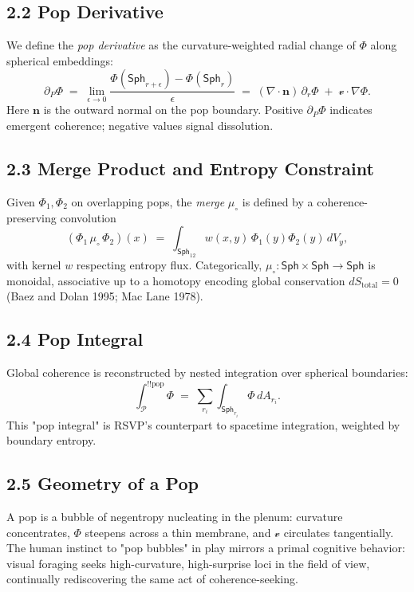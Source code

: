 \documentclass[12pt,a4paper]{article}
\newcommand{\Pl}{\mathcal{P}}
\newcommand{\Sph}{\mathsf{Sph}}
\newcommand{\vv}{\mathcal{v}}
\newcommand{\dP}{\partial_{P}}
\newcommand{\popint}{\int_{\Pl}^{!!\mathrm{pop}}}
\newcommand{\muo}{\mu_{\circ}}
\theoremstyle{definition}
\theoremstyle{plain}
\begin{document}
\subsection*{2.2 Pop Derivative}
We define the \emph{pop derivative} as the curvature-weighted radial change of $\Phi$ along spherical embeddings:
\begin{equation}
\dP \Phi \;=\; \lim_{\epsilon\to 0}\frac{\Phi(\Sph_{r+\epsilon})-\Phi(\Sph_r)}{\epsilon}
\;=\; (\nabla\cdot \mathbf{n})\,\partial_r \Phi \;+\; \vv\cdot\nabla\Phi.
\label{eq:pop-derivative}
\end{equation}
Here $\mathbf{n}$ is the outward normal on the pop boundary. Positive $\dP\Phi$ indicates emergent coherence; negative values signal dissolution.

\subsection*{2.3 Merge Product and Entropy Constraint}
Given $\Phi_1,\Phi_2$ on overlapping pops, the \emph{merge} $\muo$ is defined by a coherence-preserving convolution
\begin{equation}
(\Phi_1\,\muo\,\Phi_2)(x)\;=\;\int_{\Sph_{12}} w(x,y)\,\Phi_1(y)\Phi_2(y)\,dV_y,
\label{eq:merge}
\end{equation}
with kernel $w$ respecting entropy flux. Categorically, $\muo:\Sph\times\Sph\to\Sph$ is monoidal, associative up to a homotopy encoding global conservation $dS_{\text{total}}=0$ (Baez and Dolan 1995; Mac Lane 1978).

\subsection*{2.4 Pop Integral}
Global coherence is reconstructed by nested integration over spherical boundaries:
\begin{equation}
\popint \Phi \;=\; \sum_{r_i}\int_{\Sph_{r_i}}\Phi\,dA_{r_i}.
\label{eq:pop-integral}
\end{equation}
This "pop integral" is RSVP's counterpart to spacetime integration, weighted by boundary entropy.

\subsection*{2.5 Geometry of a Pop}
A pop is a bubble of negentropy nucleating in the plenum: curvature concentrates, $\Phi$ steepens across a thin membrane, and $\vv$ circulates tangentially. The human instinct to "pop bubbles" in play mirrors a primal cognitive behavior: visual foraging seeks high-curvature, high-surprise loci in the field of view, continually rediscovering the same act of coherence-seeking.
\end{document}
